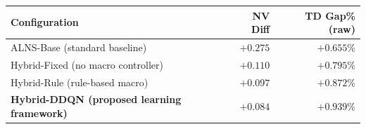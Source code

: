 \caption{Ablation Analysis: Component contributions (overall $N=62$ instances). NV Diff (mean fleet gap to BKS) falls monotonically as components are added. Raw TD Gap rises in lock-step --- an arithmetic consequence of fewer vehicles covering the same customers, \emph{not} a quality loss; the valid, vehicle-matched distance comparison is the strict fair intersection of Table~\ref{tab:distance_summary}, where Hybrid-DDQN attains the lowest gap ($+0.575\%$).}
\label{tab:ablation}
\begin{tabular}{@{}lrr@{}}
\toprule
\textbf{Configuration} & \textbf{NV Diff} & \textbf{TD Gap\% (raw)}\\
\midrule
ALNS-Base (standard baseline) & $+0.275$ & $+0.655\%$ \\
Hybrid-Fixed (no macro controller) & $+0.110$ & $+0.795\%$ \\
Hybrid-Rule (rule-based macro) & $+0.097$ & $+0.872\%$ \\
\textbf{Hybrid-DDQN (proposed learning framework)} & $\mathbf{+0.084}$ & $+0.939\%$ \\
\bottomrule
\end{tabular}
